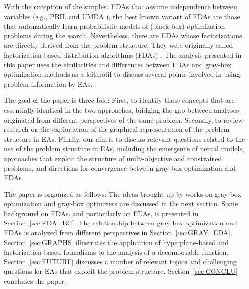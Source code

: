 \documentclass{article} %
\begin{document}
With the exception of the simplest EDAs that assume independence between variables (e.g., PBIL \cite{Baluja:1994} and UMDA \cite{Muhlenbein:1997}), the  best known variant of EDAs are those that  automatically learn probabilistic  models of (black-box) optimization problems during the search. Nevertheless, there are EDAs whose factorizations are directly derived from the problem structure. They were originally called factorization-based distribution algorithms (FDAs) \cite{Muhlenbein_et_al:1999}. The analysis presented in this paper uses  the similarities and differences between FDAs and gray-box optimization methods as a leitmotif to discuss several points involved in using problem information by EAs. 



 The goal of the paper is three-fold: First, to identify those concepts that are essentially identical in the two approaches, bridging the gap between analyses originated from different perspectives of the same problem. Secondly, to review research on the exploitation of the graphical representation of the problem structure in EAs. Finally, our aim is to discuss relevant questions related to the use of the problem structure in EAs, including the emergence of neural models,  approaches that exploit the structure of multi-objective and constrained problems, and  directions for convergence between gray-box optimization and EDAs. 
 

 The paper is organized as follows: The ideas brought up by works on gray-box optimization and gray-box optimizers  are discussed in the next section.  Some background on EDAs, and particularly on FDAs, is presented in Section~\ref{sec:EDA_BG}.  The relationship between gray-box optimization and EDAs is analyzed from different perspectives in Section~\ref{sec:GRAY_EDA}. Section~\ref{sec:GRAPHS} illustrates the application of hyperplane-based and factorization-based formalisms to the analysis of a decomposable function.  Section~\ref{sec:FUTURE} discusses a number of relevant topics and challenging questions for EAs that exploit the problem structure. Section~\ref{sec:CONCLU} concludes the paper. 
\end{document}

